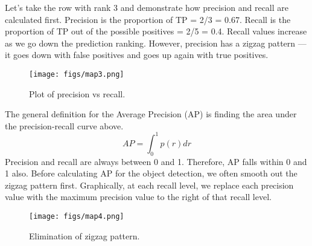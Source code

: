 Let’s take the row with rank 3 and demonstrate how precision and recall are calculated first.
Precision is the proportion of TP = 2/3 = 0.67.
Recall is the proportion of TP out of the possible positives = 2/5 = 0.4.
Recall values increase as we go down the prediction ranking. However, precision has a zigzag pattern — it goes down with false positives and goes up again with true positives.

\begin{figure}[ht]
	\centering
	\texttt{[image: figs/map3.png]}
	\caption{Plot of precision vs recall.}\label{fig:map3}
\end{figure}
The general definition for the Average Precision (AP) is finding the area under the precision-recall curve above.
$$
AP = \int_{0}^{1} p(r)dr
$$
Precision and recall are always between 0 and 1. Therefore, AP falls within 0 and 1 also. Before calculating AP for the object detection, we often smooth out the zigzag pattern first. Graphically, at each recall level, we replace each precision value with the maximum precision value to the right of that recall level.
\begin{figure}[ht]
	\centering
	\texttt{[image: figs/map4.png]}
	\caption{Elimination of zigzag pattern.}\label{fig:map4}
\end{figure}
